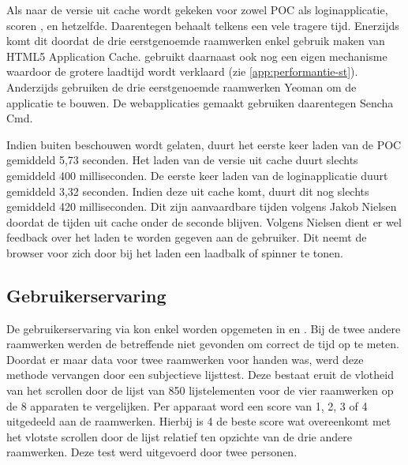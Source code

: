 Als naar de versie uit cache wordt gekeken voor zowel POC als loginapplicatie, scoren \kendo{}, \jqm{} en \lungo{} hetzelfde.
Daarentegen behaalt \st{} telkens een vele tragere tijd.
Enerzijds komt dit doordat de drie eerstgenoemde raamwerken enkel gebruik maken van HTML5 Application Cache.
\st{} gebruikt daarnaast ook nog een eigen mechanisme waardoor de grotere laadtijd wordt verklaard (zie \ref{app:performantie-st}).
Anderzijds gebruiken de drie eerstgenoemde raamwerken Yeoman om de applicatie te bouwen.
De webapplicaties gemaakt \st{} gebruiken daarentegen Sencha Cmd.


Indien \st{} buiten beschouwen wordt gelaten, duurt het eerste keer laden van de POC gemiddeld 5,73 seconden. 
Het laden van de versie uit cache duurt slechts gemiddeld 400 milliseconden.
De eerste keer laden van de loginapplicatie duurt gemiddeld 3,32 seconden.
Indien deze uit cache komt, duurt dit nog slechts gemiddeld 420 milliseconden.
Dit zijn aanvaardbare tijden volgens Jakob Nielsen~\cite{Nielsen1993} doordat de tijden uit cache onder de seconde blijven.
Volgens Nielsen dient er wel feedback over het laden te worden gegeven aan de gebruiker.
Dit neemt de browser voor zich door bij het laden een laadbalk of spinner te tonen.


\subsection{Gebruikerservaring}
\label{sec:evaluatie-gebruikerservaring}
De gebruikerservaring via \js{} kon enkel worden opgemeten in \jqm{} en \kendo{}.
Bij de twee andere raamwerken werden de betreffende  niet gevonden om correct de tijd op te meten.
Doordat er maar data voor twee raamwerken voor handen was, werd deze methode vervangen door een subjectieve lijsttest.
Deze bestaat eruit de vlotheid van het scrollen door de lijst van 850 lijstelementen voor de vier raamwerken op de 8 apparaten te vergelijken.
Per apparaat word een score van 1, 2, 3 of 4 uitgedeeld aan de raamwerken.
Hierbij is 4 de beste score wat overeenkomt met het vlotste scrollen door de lijst relatief ten opzichte van de drie andere raamwerken.
Deze test werd uitgevoerd door twee personen.

